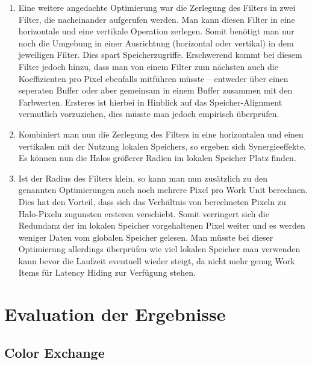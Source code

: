 \documentclass[10pt,a4paper]{article}
\begin{document}
\begin{enumerate}
\item Eine weitere angedachte Optimierung war die Zerlegung des Filters in zwei Filter, die nacheinander aufgerufen werden. Man kann diesen Filter in eine horizontale und eine vertikale Operation zerlegen. Somit benötigt man nur noch die Umgebung in einer Ausrichtung (horizontal oder vertikal) in dem jeweiligen Filter. Dies spart Speicherzugriffe. Erschwerend kommt bei diesem Filter jedoch hinzu, dass man von einem Filter zum nächsten auch die Koeffizienten pro Pixel ebenfalls mitführen müsste -- entweder über einen seperaten Buffer oder aber gemeinsam in einem Buffer zusammen mit den Farbwerten. Ersteres ist hierbei in Hinblick auf das Speicher-Alignment vermutlich vorzuziehen, dies müsste man jedoch empirisch überprüfen.


\item Kombiniert man nun die Zerlegung des Filters in eine horizontalen und einen vertikalen mit der Nutzung lokalen Speichers, so ergeben sich Synergieeffekte. Es können nun die Halos größerer Radien im lokalen Speicher Platz finden.

\item Ist der Radius des Filters klein, so kann man nun zusätzlich zu den genannten Optimierungen auch noch mehrere Pixel pro Work Unit berechnen. Dies hat den Vorteil, dass sich das Verhältnis von berechneten Pixeln zu Halo-Pixeln zugunsten ersteren verschiebt. Somit verringert sich die Redundanz der im lokalen Speicher vorgehaltenen Pixel weiter und es werden weniger Daten vom globalen Speicher gelesen. Man müsste bei dieser Optimierung allerdings überprüfen wie viel lokalen Speicher man verwenden kann bevor die Laufzeit eventuell wieder steigt, da nicht mehr genug Work Items für Latency Hiding zur Verfügung stehen.
\end{enumerate}

\section{Evaluation der Ergebnisse}
\subsection{Color Exchange}
\end{document}
